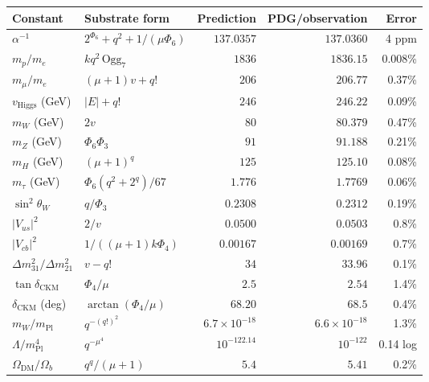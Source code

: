 \documentclass[11pt]{article}
\newcommand{\mPl}{m_{\mathrm{Pl}}}
\begin{document}
\begin{center}\small\begin{tabular}{llrrr}
\toprule
\textbf{Constant} & \textbf{Substrate form} & \textbf{Prediction} & \textbf{PDG/observation} & \textbf{Error} \\
\midrule
$\alpha^{-1}$               & $2^{\Phi_6}+q^2+1/(\mu\Phi_6)$ & $137.0357$ & $137.0360$ & 4 ppm \\
$m_p/m_e$                   & $k q^2\,\mathrm{Ogg}_7$        & $1836$    & $1836.15$ & 0.008\% \\
$m_\mu/m_e$                 & $(\mu+1)v + q!$                & $206$     & $206.77$  & 0.37\% \\
$v_{\mathrm{Higgs}}$ (GeV)  & $|E| + q!$                      & $246$     & $246.22$  & 0.09\% \\
$m_W$ (GeV)                 & $2v$                            & $80$      & $80.379$  & 0.47\% \\
$m_Z$ (GeV)                 & $\Phi_6 \Phi_3$                 & $91$      & $91.188$  & 0.21\% \\
$m_H$ (GeV)                 & $(\mu+1)^q$                     & $125$     & $125.10$  & 0.08\% \\
$m_\tau$ (GeV)              & $\Phi_6(q^2+2^q)/67$           & $1.776$   & $1.7769$  & 0.06\% \\
$\sin^2\theta_W$            & $q/\Phi_3$                       & $0.2308$  & $0.2312$  & 0.19\% \\
$|V_{us}|^2$                & $2/v$                            & $0.0500$  & $0.0503$  & 0.8\% \\
$|V_{cb}|^2$                & $1/((\mu+1)k\Phi_4)$            & $0.00167$ & $0.00169$ & 0.7\% \\
$\Delta m^2_{31}/\Delta m^2_{21}$ & $v - q!$                  & $34$      & $33.96$   & 0.1\% \\
$\tan\delta_{\mathrm{CKM}}$ & $\Phi_4/\mu$                    & $2.5$     & $2.54$    & 1.4\% \\
$\delta_{\mathrm{CKM}}$ (deg) & $\arctan(\Phi_4/\mu)$         & $68.20$   & $68.5$    & 0.4\% \\
$m_W/\mPl$                  & $q^{-(q!)^2}$                    & $6.7\!\times\!10^{-18}$ & $6.6\!\times\!10^{-18}$ & 1.3\% \\
$\Lambda/\mPl^4$            & $q^{-\mu^4}$                     & $10^{-122.14}$ & $10^{-122}$ & 0.14 log \\
$\Omega_{\mathrm{DM}}/\Omega_b$ & $q^q/(\mu+1)$                  & $5.4$     & $5.41$    & 0.2\% \\

\end{tabular}
\end{center}
\end{document}
